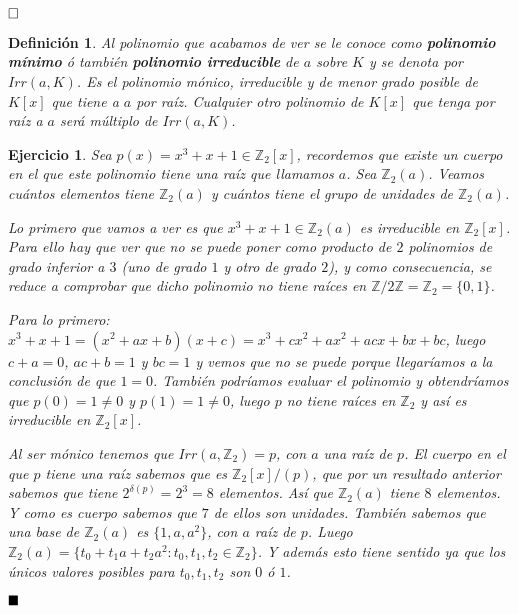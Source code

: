 \documentclass[12pt]{article}
\newtheorem{definition}[theorem]{Definición}
\newtheorem{exercise}{Ejercicio}
\begin{document}
$\hfill \square$

\begin{definition}Al polinomio que acabamos de ver se le conoce como \textbf{polinomio mínimo } ó también \textbf{polinomio irreducible} de $a$ sobre $K$ y se denota por $Irr(a,K)$. Es el polinomio mónico, irreducible y de menor grado posible de $K[x]$ que tiene a $a$ por raíz. Cualquier otro polinomio de $K[x]$ que tenga por raíz a $a$ será múltiplo de $Irr(a,K)$.
\end{definition}

\begin{exercise}Sea $p(x) = x^3+x+1 \in \mathbb{Z}_2[x]$, recordemos que existe un cuerpo en el que este polinomio tiene una raíz que llamamos $a$. Sea $\mathbb{Z}_2 (a)$. Veamos cuántos elementos tiene $\mathbb{Z}_2(a)$ y cuántos tiene el grupo de unidades de $\mathbb{Z}_2(a)$.

Lo primero que vamos a ver es que $x^3+x+1 \in \mathbb{Z}_2(a)$ es irreducible en $\mathbb{Z}_2[x]$. Para ello hay que ver que no se puede poner como producto de $2$ polinomios de grado inferior a $3$ (uno de grado $1$ y otro de grado $2$), y como consecuencia, se reduce a comprobar que dicho polinomio no tiene raíces en $\mathbb{Z}/2\mathbb{Z} = \mathbb{Z}_2 = \lbrace 0, 1 \rbrace$. 

Para lo primero: $x^3+x+1 = (x^2+ax+b)(x+c) = x^3 + cx^2 +ax^2 + acx + bx +bc$, luego $c+a=0$, $ac+b = 1$ y $bc=1$ y vemos que no se puede porque llegaríamos a la conclusión de que $1 =0$. También podríamos evaluar el polinomio y obtendríamos que $p(0) = 1 \neq 0$ y $p(1) = 1 \neq 0$, luego $p$ no tiene raíces en $\mathbb{Z}_2$ y así es irreducible en $\mathbb{Z}_2[x]$.

Al ser mónico tenemos que $Irr(a,\mathbb{Z}_2) = p$, con $a$ una raíz de $p$. El cuerpo en el que $p$ tiene una raíz sabemos que es $\mathbb{Z}_2[x]/(p)$, que por un resultado anterior sabemos que tiene $2^{\delta(p)} = 2^3 = 8$ elementos. Así que $\mathbb{Z}_2(a)$ tiene $8$ elementos. Y como es cuerpo sabemos que $7$ de ellos son unidades. También sabemos que una base de $\mathbb{Z}_2(a)$ es $\lbrace 1, a, a^2 \rbrace$, con $a$ raíz de $p$. Luego $\mathbb{Z}_2(a) = \lbrace t_0 + t_1a + t_2a^2 : t_0,t_1,t_2\in \mathbb{Z}_2 \rbrace$. Y además esto tiene sentido ya que los únicos valores posibles para $t_0,t_1,t_2$ son $0$ ó $1$.
\end{exercise}
$\hfill \blacksquare$
\end{document}

